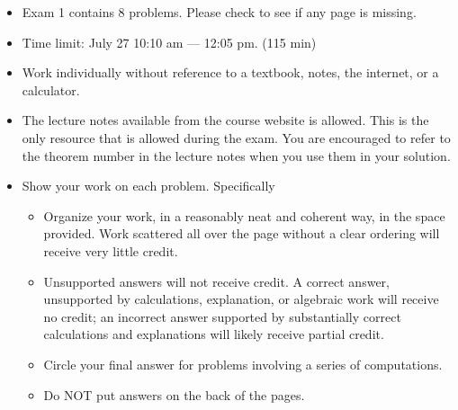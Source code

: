 \documentclass[12pt]{amsart}
\theoremstyle{definition}
\begin{document}


\vspace{3em}

\begin{itemize}
\item Exam 1 contains 8 problems. Please check to see if any page is missing.\vspace{1em}
\item Time limit: July 27 10:10 am --- 12:05 pm. (115 min)\vspace{1em}
\item Work individually without reference to a textbook, notes, the internet, or a calculator.\vspace{1em}
\item The lecture notes available from the course website is allowed. This is the only resource that is allowed during the exam. You are encouraged to refer to the theorem number in the lecture notes when you use them in your solution.\vspace{1em}
\item Show your work on each problem. Specifically\vspace{0.5em}
\begin{itemize}
\item Organize your work, in a reasonably neat and coherent way, in the space provided. Work scattered all over the page without a clear ordering
will receive very little credit.\vspace{0.5em}
\item Unsupported answers will not receive credit. A correct answer, unsupported by calculations, explanation, or algebraic work will receive no credit; an incorrect answer supported by substantially correct calculations and explanations will likely receive partial credit.\vspace{0.5em}
\item Circle your final answer for problems involving a series of computations.\vspace{0.5em}
\item Do NOT put answers on the back of the pages.
\end{itemize}
\end{itemize}



\vspace{2em}
\newpage
\end{document}

